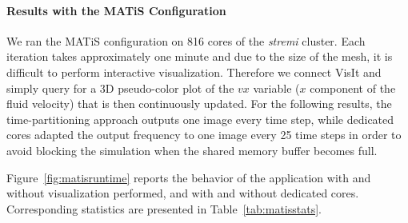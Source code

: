 \paragraph{Results with the MATiS Configuration}
We ran the MATiS configuration on 816 cores of the \emph{stremi} cluster. Each 
iteration takes approximately one minute and due to the size of the
mesh, it is difficult to perform interactive visualization. 
Therefore we connect VisIt and simply query for a 3D pseudo-color plot of the $vx$ 
variable ($x$ component of the fluid velocity) that is then continuously updated.
For the following results, the time-partitioning approach outputs one image every time step,
while dedicated cores adapted the output frequency to one image every 25 
time steps in order to avoid blocking the simulation when the shared memory buffer becomes full.

Figure~\ref{fig:matisruntime} reports the behavior of the application with and 
without visualization performed, and with and without dedicated cores. 
Corresponding statistics are presented in Table~\ref{tab:matisstats}.

